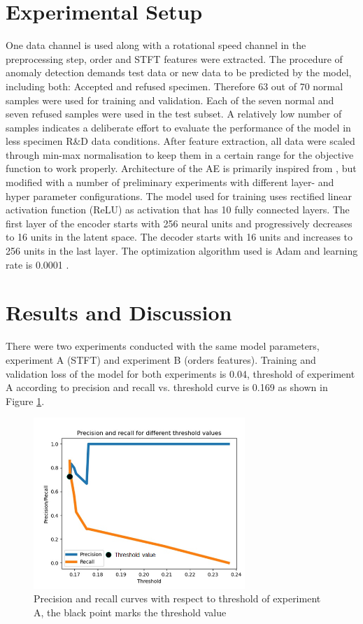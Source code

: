 \documentclass[a4paper, 10pt, twocolumn]{article}
\begin{document}
 \section*{Experimental Setup}
\label{sec:Experimental Setup}
One data channel is used along with a rotational speed channel in the preprocessing step, order and STFT features were extracted. The procedure of anomaly detection demands test data or new data to be predicted by the model, including both: Accepted and refused specimen. Therefore 63 out of 70 normal samples were used for training and validation. Each of the seven normal and seven refused samples were used in the test subset. A relatively low number of samples indicates a deliberate effort to evaluate the performance of the model in less specimen R\&D data conditions. After feature extraction, all data were scaled through min-max normalisation to keep them in a certain range for the objective function to work properly. Architecture of the AE is primarily inspired from \cite{b7}, but modified with a number of preliminary experiments with different layer- and hyper parameter configurations. The model used for training uses rectified linear activation function (ReLU) as activation that has 10 fully connected layers. The first layer of the encoder starts with 256 neural units and progressively decreases to 16 units in the latent space. The decoder starts with 16 units and increases to 256 units in the last layer. The optimization algorithm used is Adam and learning rate is 0.0001 \cite{b8}.

\section*{Results and Discussion}
\label{sec:Results and Discussion}
There were two experiments conducted with the same model parameters, experiment A (STFT) and experiment B (orders features). Training and validation loss of the model for both experiments is 0.04, threshold of experiment A according to precision and recall vs. threshold curve is 0.169 as shown in Figure \ref{fig:threshold_expa}.

\begin{figure}[t]
    \begin{center}
        \includegraphics[width=8cm]{stft_threshold_new.png}
    \end{center}
    \caption{Precision and recall curves with respect to threshold of experiment A, the black point marks the threshold value}
    \label{fig:threshold_expa}
\end{figure}
\end{document}
